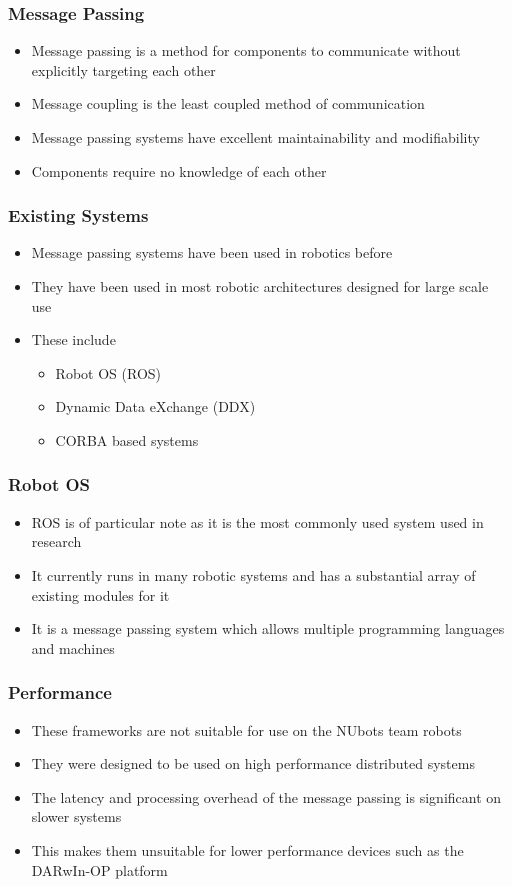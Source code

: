 \documentclass{beamer}
\begin{document}
\begin{frame}
	\frametitle{Message Passing}
	\begin{itemize}
		\item Message passing is a method for components to communicate without explicitly targeting each other
		\item Message coupling is the least coupled method of communication
		\item Message passing systems have excellent maintainability and modifiability
		\item Components require no knowledge of each other
	\end{itemize}
\end{frame}

\begin{frame}
	\frametitle{Existing Systems}
	\begin{itemize}
		\item Message passing systems have been used in robotics before
		\item They have been used in most robotic architectures designed for large scale use
		\item These include
		\begin{itemize}
			\item Robot OS (ROS)
			\item Dynamic Data eXchange (DDX)
			\item CORBA based systems
		\end{itemize}
	\end{itemize}
\end{frame}

\begin{frame}
	\frametitle{Robot OS}
	\begin{itemize}
		\item ROS is of particular note as it is the most commonly used system used in research
		\item It currently runs in many robotic systems and has a substantial array of existing modules for it
		\item It is a message passing system which allows multiple programming languages and machines
	\end{itemize}
\end{frame}

\begin{frame}
	\frametitle{Performance}
	\begin{itemize}
		\item These frameworks are not suitable for use on the NUbots team robots
		\item They were designed to be used on high performance distributed systems
		\item The latency and processing overhead of the message passing is significant on slower systems
		\item This makes them unsuitable for lower performance devices such as the DARwIn-OP platform
	\end{itemize}
\end{frame}
\end{document}
